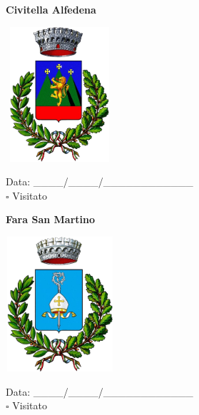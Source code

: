 \documentclass[a5paper,12pt]{article}
\begin{document}
\newpage

\noindent
\begin{minipage}[t]{0.45\textwidth}
    \begin{center}
        \textbf{Civitella Alfedena}
    \end{center}
    \vspace{-0.5cm} %
    \begin{center}
        \includegraphics[height= 5cm, width=4cm]{Abruzzo/Civitella_Alfedena-Stemma.png}
    \end{center}
    \vspace{-0.4cm} %
    \begin{flushleft}
        Data: \_\_\_\_/\_\_\_\_/\_\_\_\_\_\_\_\_\_\_\_\_ \\
        $\square$ Visitato
    \end{flushleft}
\end{minipage}
\hfill
\noindent
\begin{minipage}[t]{0.45\textwidth}
    \begin{center}
        \textbf{Fara San Martino}
    \end{center}
    \vspace{-0.5cm} %
    \begin{center}
        \includegraphics[height= 5cm, width=4cm]{Abruzzo/Fara_San_Martino-Stemma.png}
    \end{center}
    \vspace{-0.4cm} %
    \begin{flushleft}
        Data: \_\_\_\_/\_\_\_\_/\_\_\_\_\_\_\_\_\_\_\_\_ \\
        $\square$ Visitato
    \end{flushleft}
\end{minipage}
\end{document}
